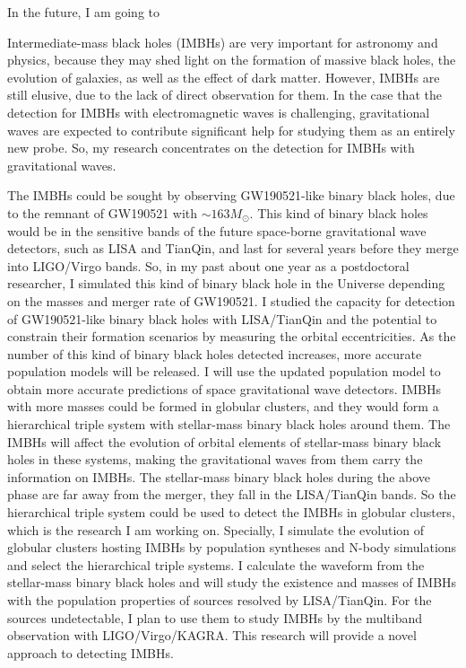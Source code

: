 \documentclass[12pt,a4paper,sans]{article}%
\begin{document}
In the future, I am going to 

Intermediate-mass black holes (IMBHs) are very important for astronomy and physics, because they may shed
light on the formation of massive black holes, the evolution of galaxies, as well as the effect of dark matter. However, IMBHs
are still elusive, due to the lack of direct observation for them. In the case that the detection for IMBHs with
electromagnetic waves is challenging, gravitational waves are expected to contribute significant help for studying them 
as an entirely new probe. So, my research concentrates on the detection for IMBHs with gravitational waves.

The IMBHs could be sought by observing GW190521-like binary black holes, due to the
remnant of GW190521 with $\sim163M_{\odot}$. This kind of binary black holes would be in the sensitive bands of the
future space-borne gravitational wave detectors, such as LISA and TianQin, and last for several years before they
merge into LIGO/Virgo bands. So, in my past about one year as a postdoctoral researcher, I simulated this kind of binary
black hole in the Universe depending on the masses and merger rate of GW190521. I studied the capacity for detection of GW190521-like
binary black holes with LISA/TianQin and the potential to constrain their formation scenarios by measuring the orbital
eccentricities. As the number of this kind of binary black holes detected increases, more accurate population models will
be released. I will use the updated population model to obtain more accurate predictions of space gravitational wave
detectors. IMBHs with more masses could be formed in globular
clusters, and they would form a hierarchical triple system with stellar-mass binary black holes around them. The IMBHs
will affect the evolution of orbital elements of stellar-mass binary black holes in these systems, making the
gravitational waves from them carry the information on IMBHs. The stellar-mass binary black holes during the above phase
are far away from the merger, they fall in the LISA/TianQin bands. So the hierarchical triple system could be used to
detect the IMBHs in globular clusters, which is the research I am working on. Specially, I simulate the evolution of
globular clusters hosting IMBHs by population syntheses and N-body simulations and select the hierarchical triple
systems. I calculate the waveform from the stellar-mass binary black holes and will study the existence and masses of
IMBHs with the population properties of sources resolved by LISA/TianQin. For the sources undetectable, I plan to use
them to study IMBHs by the multiband observation with LIGO/Virgo/KAGRA. This research will provide a novel approach to
detecting IMBHs.
\end{document}
